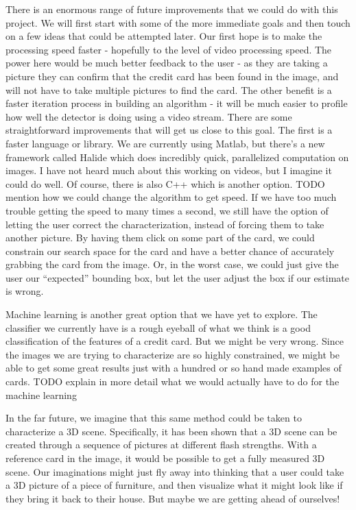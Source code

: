 \documentclass[10pt,twocolumn,letterpaper]{article}
\begin{document}
There is an enormous range of future improvements that we could do with this project. We will first start with some of the more immediate goals and then touch on a few ideas that could be attempted later. Our first hope is to make the processing speed faster - hopefully to the level of video processing speed. The power here would be much better feedback to the user - as they are taking a picture they can confirm that the credit card has been found in the image, and will not have to take multiple pictures to find the card. The other benefit is a faster iteration process in building an algorithm - it will be much easier to profile how well the detector is doing using a video stream. There are some straightforward improvements that will get us close to this goal. The first is a faster language or library. We are currently using Matlab, but there’s a new framework called Halide which does incredibly quick, parallelized computation on images. I have not heard much about this working on videos, but I imagine it could do well. Of course, there is also C++ which is another option. TODO mention how we could change the algorithm to get speed.
If we have too much trouble getting the speed to many times a second, we still have the option of letting the user correct the characterization, instead of forcing them to take another picture. By having them click on some part of the card, we could constrain our search space for the card and have a better chance of accurately grabbing the card from the image. Or, in the worst case, we could just give the user our “expected” bounding box, but let the user adjust the box if our estimate is wrong.

Machine learning is another great option that we have yet to explore. The classifier we currently have is a rough eyeball of what we think is a good classification of the features of a credit card. But we might be very wrong. Since the images we are trying to characterize are so highly constrained, we might be able to get some great results just with a hundred or so hand made examples of cards. TODO explain in more detail what we would actually have to do for the machine learning

In the far future, we imagine that this same method could be taken to characterize a 3D scene. Specifically, it has been shown that a 3D scene can be created through a sequence of pictures at different flash strengths. With a reference card in the image, it would be possible to get a fully measured 3D scene. Our imaginations might just fly away into thinking that a user could take a 3D picture of a piece of furniture, and then visualize what it might look like if they bring it back to their house. But maybe we are getting ahead of ourselves!


\clearpage
{\small


}
\end{document}
